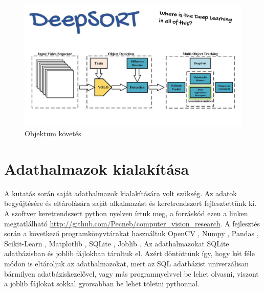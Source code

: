 \documentclass[acmtog, authorversion]{acmart}
\begin{document}
\begin{figure}
    \includegraphics[width=1\columnwidth]{deepsort_yolo_figs/deepsort_block_diagram.jpg}
    \caption{Objektum követés}
    \label{ObjectTracking}
\end{figure}

\section{Adathalmazok kialakítása}
A kutatás során saját adathalmazok kialakítására volt szükség. Az adatok begyűjtésére és eltárolására saját alkalmazást és keretrendszert
fejlesztettünk ki. A szoftver keretrendszert python nyelven írtuk meg, a forráskód ezen a linken megtatlálható \url{http://github.com/Pecneb/computer_vision_research}.
A fejlesztés során a következő programkönyvtárakat használtuk OpenCV \cite{opencv_library}, Numpy \cite{harris2020array}, Pandas \cite{reback2020pandas}, 
Scikit-Learn \cite{scikit-learn}, Matplotlib \cite{Hunter:2007}, SQLite \cite{sqlite2020hipp}, Joblib \cite{joblib_library}. Az adathalmazokat SQLite adatbázisban és
joblib fájlokban tároltuk el. Azért döntöttünk így, hogy két féle módon is eltároljuk az adathalmazokat, mert az SQL adatbázist univerzálisan
bármilyen adatbáziskezelővel, vagy más programnyelvvel be lehet olvasni, viszont a joblib fájlokat sokkal gyorsabban be lehet töletni pythonnal.
\end{document}
